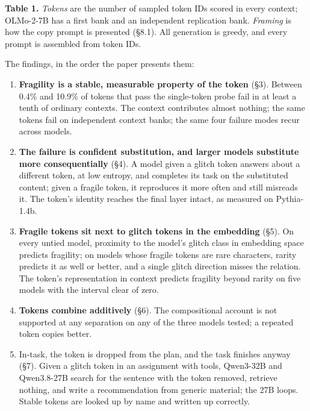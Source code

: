 \documentclass[11pt]{article}
\newenvironment{tabcaption}{\par\vspace{3pt}\small\setlength{\parindent}{0pt}\ignorespaces}{\par\vspace{14pt}}
\begin{document}
\begin{tabcaption}
\textbf{Table 1.} \emph{Tokens} are the number of sampled token IDs scored in every context; OLMo-2-7B has a first bank and an independent replication bank. \emph{Framing} is how the copy prompt is presented (§8.1). All generation is greedy, and every prompt is assembled from token IDs.
\end{tabcaption}

The findings, in the order the paper presents them:

\begin{enumerate}
\def\labelenumi{\arabic{enumi}.}
\item
  \textbf{Fragility is a stable, measurable property of the token} (§3). Between 0.4\% and 10.9\% of tokens that pass the single-token probe fail in at least a tenth of ordinary contexts. The context contributes almost nothing; the same tokens fail on independent context banks; the same four failure modes recur across models.
\item
  \textbf{The failure is confident substitution, and larger models substitute more consequentially} (§4). A model given a glitch token answers about a different token, at low entropy, and completes its task on the substituted content; given a fragile token, it reproduces it more often and still misreads it. The token's identity reaches the final layer intact, as measured on Pythia-1.4b.
\item
  \textbf{Fragile tokens sit next to glitch tokens in the embedding} (§5). On every untied model, proximity to the model's glitch class in embedding space predicts fragility; on models whose fragile tokens are rare characters, rarity predicts it as well or better, and a single glitch direction misses the relation. The token's representation in context predicts fragility beyond rarity on five models with the interval clear of zero.
\item
  \textbf{Tokens combine additively} (§6). The compositional account is not supported at any separation on any of the three models tested; a repeated token copies better.
\item
  In-task, the token is dropped from the plan, and the task finishes anyway (§7). Given a glitch token in an assignment with tools, Qwen3-32B and Qwen3.8-27B search for the sentence with the token removed, retrieve nothing, and write a recommendation from generic material; the 27B loops. Stable tokens are looked up by name and written up correctly.
\end{enumerate}
\end{document}
